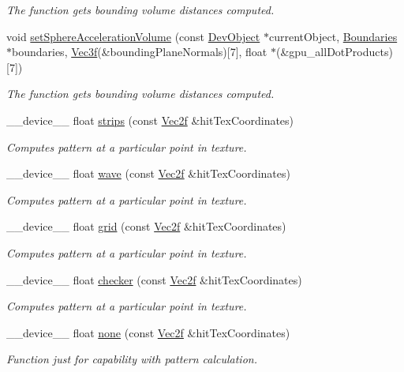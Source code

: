 \begin{DoxyCompactItemize}
\begin{DoxyCompactList}\small\item\em The function gets bounding volume distances computed. \end{DoxyCompactList}\item 
void \hyperlink{group__intersection__test__prperties_gafd2f15ce4a55fb0d8daee0bff024b67b}{set\+Sphere\+Acceleration\+Volume} (const \hyperlink{class_dev_object}{Dev\+Object} $\ast$current\+Object, \hyperlink{class_boundaries}{Boundaries} $\ast$boundaries, \hyperlink{class_vec3}{Vec3f}(\&bounding\+Plane\+Normals)\mbox{[}7\mbox{]}, float $\ast$(\&gpu\+\_\+all\+Dot\+Products)\mbox{[}7\mbox{]})
\begin{DoxyCompactList}\small\item\em The function gets bounding volume distances computed. \end{DoxyCompactList}\item 
\+\_\+\+\_\+device\+\_\+\+\_\+ float \hyperlink{group__intersection__test__prperties_gae0b690ff7b5f9b93e53bb0c1437fbf55}{strips} (const \hyperlink{class_vec2}{Vec2f} \&hit\+Tex\+Coordinates)
\begin{DoxyCompactList}\small\item\em Computes pattern at a particular point in texture. \end{DoxyCompactList}\item 
\+\_\+\+\_\+device\+\_\+\+\_\+ float \hyperlink{group__intersection__test__prperties_gaff97add1678535636b1f4f1ca3f7a96c}{wave} (const \hyperlink{class_vec2}{Vec2f} \&hit\+Tex\+Coordinates)
\begin{DoxyCompactList}\small\item\em Computes pattern at a particular point in texture. \end{DoxyCompactList}\item 
\+\_\+\+\_\+device\+\_\+\+\_\+ float \hyperlink{group__intersection__test__prperties_ga4db329f1c6b211cd0ac9e6dc297f279e}{grid} (const \hyperlink{class_vec2}{Vec2f} \&hit\+Tex\+Coordinates)
\begin{DoxyCompactList}\small\item\em Computes pattern at a particular point in texture. \end{DoxyCompactList}\item 
\+\_\+\+\_\+device\+\_\+\+\_\+ float \hyperlink{group__intersection__test__prperties_ga100df37360dfe6954f51431bc6343dc6}{checker} (const \hyperlink{class_vec2}{Vec2f} \&hit\+Tex\+Coordinates)
\begin{DoxyCompactList}\small\item\em Computes pattern at a particular point in texture. \end{DoxyCompactList}\item 
\+\_\+\+\_\+device\+\_\+\+\_\+ float \hyperlink{group__intersection__test__prperties_ga6ea9f9e6624268a263962a17c6634feb}{none} (const \hyperlink{class_vec2}{Vec2f} \&hit\+Tex\+Coordinates)
\begin{DoxyCompactList}\small\item\em Function just for capability with pattern calculation. \end{DoxyCompactList}\end{DoxyCompactItemize}


